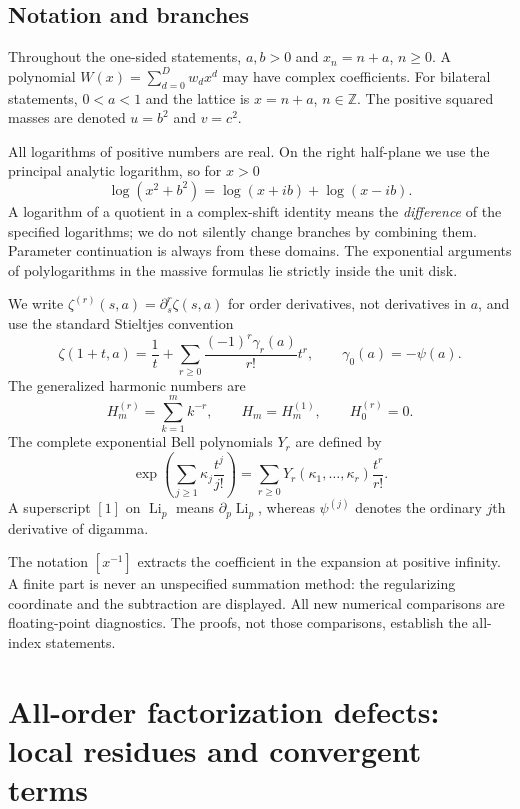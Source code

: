 \documentclass[11pt,letterpaper]{article}
\numberwithin{equation}{section}
\theoremstyle{definition}
\newcommand{\Li}{\operatorname{Li}}
\newcommand{\Z}{\mathbb Z}
\begin{document}
\subsection{Notation and branches}
Throughout the one-sided statements, $a,b>0$ and $x_n=n+a$, $n\ge0$.
A polynomial $W(x)=\sum_{d=0}^{D}w_dx^d$ may have complex coefficients.
For bilateral statements, $0<a<1$ and the lattice is $x=n+a$, $n\in\Z$.
The positive squared masses are denoted $u=b^2$ and $v=c^2$.

All logarithms of positive numbers are real. On the right half-plane
we use the principal analytic logarithm, so for $x>0$
\[
\log(x^2+b^2)=\log(x+ib)+\log(x-ib).
\]
A logarithm of a quotient in a complex-shift identity means the
\emph{difference} of the specified logarithms; we do not silently change
branches by combining them. Parameter continuation is always from these
domains. The exponential arguments of polylogarithms in the massive
formulas lie strictly inside the unit disk.

We write $\zeta^{(r)}(s,a)=\partial_s^r\zeta(s,a)$ for order derivatives,
not derivatives in $a$, and use the standard Stieltjes convention
\begin{equation}\label{hqj:eq:stieltjes}
\zeta(1+t,a)=\frac1t+\sum_{r\ge0}\frac{(-1)^r\gamma_r(a)}{r!}t^r,
\qquad \gamma_0(a)=-\psi(a).
\end{equation}
The generalized harmonic numbers are
\[
H_m^{(r)}=\sum_{k=1}^m k^{-r},\qquad H_m=H_m^{(1)},\qquad H_0^{(r)}=0.
\]
The complete exponential Bell polynomials $Y_r$ are defined by
\begin{equation}\label{hqj:eq:bell}
\exp\left(\sum_{j\ge1}\kappa_j\frac{t^j}{j!}\right)
=\sum_{r\ge0}Y_r(\kappa_1,\ldots,\kappa_r)\frac{t^r}{r!}.
\end{equation}
A superscript $[1]$ on $\Li_p$ means $\partial_p\Li_p$, whereas
$\psi^{(j)}$ denotes the ordinary $j$th derivative of digamma.

The notation $[x^{-1}]$ extracts the coefficient in the expansion at
positive infinity. A finite part is never an unspecified summation
method: the regularizing coordinate and the subtraction are displayed.
All new numerical comparisons are floating-point diagnostics. The
proofs, not those comparisons, establish the all-index statements.


\section{All-order factorization defects: local residues and convergent terms}
\label{hqj:sec:local}
\end{document}

